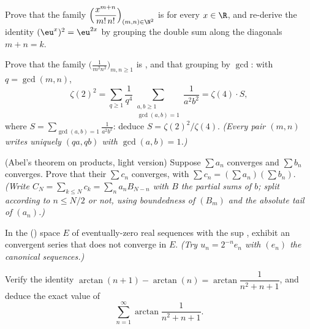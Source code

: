 \begin{exercise}[$\star\star$]\label{exo:b2:series:6}
Prove that the family
$\Bigl(\dfrac{x^{m+n}}{m!\,n!}\Bigr)_{(m,n)\in\N^2}$ is 
for every $x \in \R$, and re-derive the identity $(\eu^x)^2 =
\eu^{2x}$ by grouping the double sum along the diagonals $m + n =
k$.
\end{exercise}

\begin{exercise}[$\star\star$]\label{exo:b2:series:7}
Prove that the family $\bigl(\frac{1}{m^2 n^2}\bigr)_{m,n \geq 1}$
is , and that grouping by $\gcd$: with $q = \gcd(m,n)$,
\[
\zeta(2)^2 = \sum_{q\geq1} \frac{1}{q^4}
\sum_{\substack{a,b \geq 1\\ \gcd(a,b)=1}} \frac{1}{a^2b^2}
= \zeta(4) \cdot S,
\]
where $S = \sum_{\gcd(a,b)=1} \frac{1}{a^2b^2}$: deduce $S =
\zeta(2)^2/\zeta(4)$. \emph{(Every pair $(m,n)$ writes uniquely
$(qa, qb)$ with $\gcd(a,b) = 1$.)}
\end{exercise}

\begin{exercise}[$\star\star\star$]\label{exo:b2:series:8}
(Abel's theorem on products, light version) Suppose $\sum a_n$
converges  and $\sum b_n$ converges. Prove that their
 $\sum c_n$ converges, with $\sum c_n = (\sum
a_n)(\sum b_n)$. \emph{(Write $C_N = \sum_{k\leq N} c_k = \sum_n
a_n B_{N-n}$ with $B$ the partial sums of $b$; split according to
$n \leq N/2$ or not, using boundedness of $(B_m)$ and the absolute
tail of $(a_n)$.)}
\end{exercise}

\begin{exercise}[$\star\star\star$]\label{exo:b2:series:9}
In the () space $E$ of eventually-zero real sequences
with the sup , exhibit an  convergent series that does
not converge in $E$. \emph{(Try $u_n = 2^{-n} e_n$ with $(e_n)$ the
canonical sequences.)}
\end{exercise}

\begin{exercise}[$\star\star$]\label{exo:b2:series:10}
Verify the identity $\arctan(n+1) - \arctan(n) =
\arctan\dfrac{1}{n^2 + n + 1}$, and deduce the exact value of
\[
\sum_{n=1}^{\infty} \arctan\frac{1}{n^2 + n + 1} .
\]
\end{exercise}

